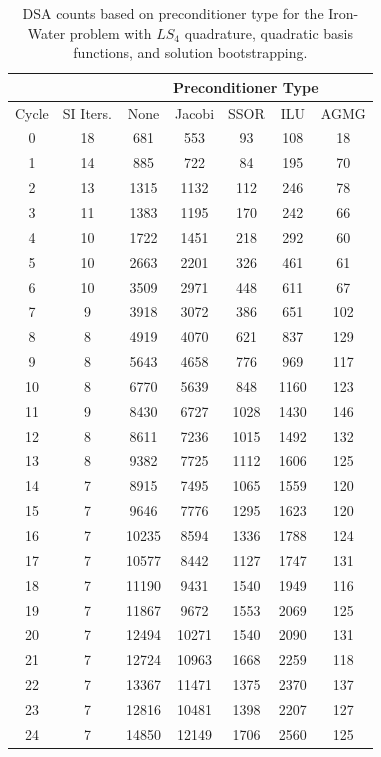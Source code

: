 \begin{table}
\caption{DSA counts based on preconditioner type for the Iron-Water problem with $LS_4$ quadrature, quadratic basis functions, and solution bootstrapping.}
\begin{center}
\def\arraystretch{1.25}
\begin{tabular}{|c|c|c|c|c|c|c|}
\hline
& & \multicolumn{5}{c}{Preconditioner Type}\vline\\
\hline
Cycle & SI Iters. & None&Jacobi&SSOR& ILU& AGMG \\
\hline
0&18&681&553&93&108&18\\
1&14&885&722&84&195&70\\
2&13&1315&1132&112&246&78\\
3&11&1383&1195&170&242&66\\
4&10&1722&1451&218&292&60\\
5&10&2663&2201&326&461&61\\
6&10&3509&2971&448&611&67\\
7&9&3918&3072&386&651&102\\
8&8&4919&4070&621&837&129\\
9&8&5643&4658&776&969&117\\
10&8&6770&5639&848&1160&123\\
11&9&8430&6727&1028&1430&146\\
12&8&8611&7236&1015&1492&132\\
13&8&9382&7725&1112&1606&125\\
14&7&8915&7495&1065&1559&120\\
15&7&9646&7776&1295&1623&120\\
16&7&10235&8594&1336&1788&124\\
17&7&10577&8442&1127&1747&131\\
18&7&11190&9431&1540&1949&116\\
19&7&11867&9672&1553&2069&125\\
20&7&12494&10271&1540&2090&131\\
21&7&12724&10963&1668&2259&118\\
22&7&13367&11471&1375&2370&137\\
23&7&12816&10481&1398&2207&127\\
24&7&14850&12149&1706&2560&125\\
\hline
\end{tabular}
\end{center}
\label{tab::DSA_IW_LS4_k2_boot}
\end{table}


